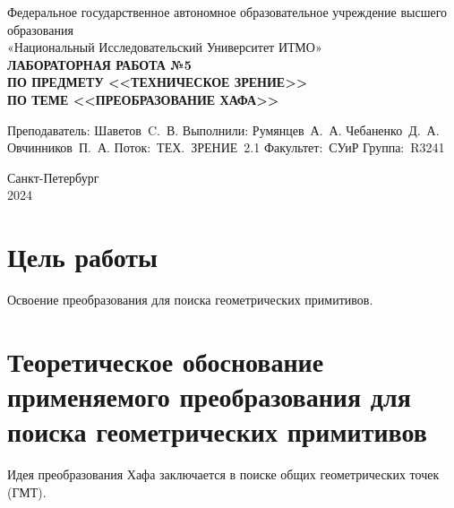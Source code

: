\documentclass[a4paper, 16pt]{article}
\begin{document}
\begin{titlepage}

    \begin{center}
    \vfill
    
    Федеральное государственное автономное образовательное учреждение высшего образования\\
    «Национальный Исследовательский Университет ИТМО»\ \\
    
    \vfill
    {\large\bf ЛАБОРАТОРНАЯ РАБОТА №5\\
        ПО ПРЕДМЕТУ <<ТЕХНИЧЕСКОЕ ЗРЕНИЕ>>\\
        ПО ТЕМЕ <<ПРЕОБРАЗОВАНИЕ ХАФА>>}
    \vfill
        
    \begin{flushright}
        \begin{minipage}{.45\textwidth}
        {
            \hbox{Преподаватель:}
            \hbox{Шаветов C. В.}
            \hbox{}
            \hbox{Выполнили:} 
            \hbox{Румянцев А. А.}
            \hbox{Чебаненко Д. А.}
            \hbox{Овчинников П. А.}
            \hbox{}
            \hbox{Поток: ТЕХ. ЗРЕНИЕ 2.1}
            \hbox{Факультет: СУиР}
            \hbox{Группа: R3241}
        }
        \end{minipage}
    \end{flushright}
    
    \vfill
            
    Санкт-Петербург\\
    2024
    \end{center}
    \end{titlepage}
    \setlength{\parskip}{1.5mm}
    
    \tableofcontents

    \newpage
    \setlength{\headheight}{12pt}
    \setlength{\footskip}{12pt}


    \section{Цель работы}
    \noindent Освоение преобразования для поиска геометрических примитивов.

    
    \section{Теоретическое обоснование применяемого преобразования для поиска геометрических примитивов}
    \noindent Идея преобразования Хафа заключается в поиске общих геометрических точек (ГМТ).
    
\end{document}
